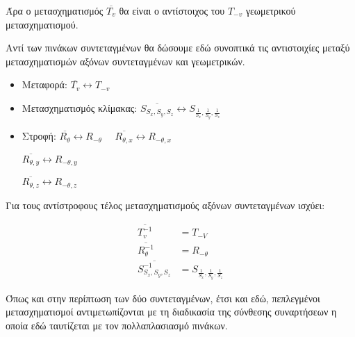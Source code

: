 Άρα ο μετασχηματισμός \( \overline{T_v} \) θα είναι ο αντίστοιχος του \( T_{-v} \) γεωμετρικού μετασχηματισμού.

Αντί των πινάκων συντεταγμένων θα δώσουμε εδώ συνοπτικά τις αντιστοιχίες μεταξύ μετασχηματισμών αξόνων συντεταγμένων και γεωμετρικών.

\begin{itemize}
    \item Μεταφορά:  
    \( \overline{T_v} \longleftrightarrow T_{-v} \)

    \item Μετασχηματισμός κλίμακας:  
    \( \overline{S_{S_x,S_y,S_z}} \longleftrightarrow S_{\frac{1}{S_x}, \frac{1}{S_y}, \frac{1}{S_z}} \)

    \item Στροφή:  
    \( \overline{R_{\theta}} \longleftrightarrow R_{-\theta} \quad \)
    \( \overline{R_{\theta,x}} \longleftrightarrow R_{-\theta,x} \)

    \( \overline{R_{\theta,y}} \longleftrightarrow R_{-\theta,y} \)

    \( \overline{R_{\theta,z}} \longleftrightarrow R_{-\theta,z} \)
\end{itemize}

Για τους αντίστροφους τέλος μετασχηματισμούς αξόνων συντεταγμένων ισχύει:

\begin{align*}
	\overline{T^{-1}_{v}} &= T_{-V} \\
	\overline{R^{-1}_{\theta}} &= R_{-\theta} \\ 
	\overline{S^{-1}_{S_x,S_y,S_z}} &= S_{\frac{1}{S_x}, \frac{1}{S_y}, \frac{1}{S_z}}
\end{align*}

 

\begin{remark}
	Όπως και στην περίπτωση των δύο συντεταγμένων, έτσι και εδώ, πεπλεγμένοι μετασχηματισμοί αντιμετωπίζονται με τη διαδικασία της σύνθεσης συναρτήσεων η οποία εδώ ταυτίζεται με τον πολλαπλασιασμό πινάκων. 
\end{remark}












